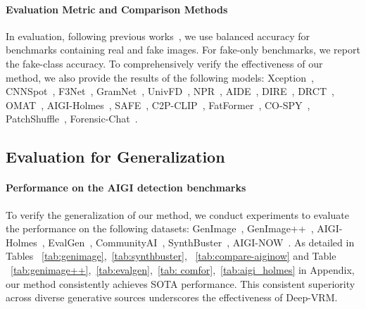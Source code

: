\documentclass{article}
\theoremstyle{plain}
\theoremstyle{definition}
\theoremstyle{remark}
\begin{document}
\paragraph{Evaluation Metric and Comparison Methods}
In evaluation, following previous works~\cite{yan2025orthogonal,chen2025dual}, we use balanced accuracy for benchmarks containing real and fake images. For fake-only benchmarks, we report the fake-class accuracy.
To comprehensively verify the effectiveness of our method, we also provide the results of the following models:
Xception~\citep{chollet2017xception}, CNNSpot~\citep{wang2020cnn}, F3Net~\citep{qian2020thinking}, GramNet~\citep{liu2020global}, UnivFD~\citep{ojha2023towards}, NPR~\citep{tan2024rethinking}, AIDE~\citep{yan2025a}, DIRE~\citep{wang2023dire}, DRCT~\citep{chen2024drct}, OMAT~\citep{zhou2025breaking}, AIGI-Holmes~\citep{zhou2025aigi}, SAFE~\citep{li2025improving}, C2P-CLIP~\citep{tan2025c2p}, FatFormer~\citep{liu2024forgery}, CO-SPY~\citep{cheng2025co}, PatchShuffle~\citep{zheng2024breaking}, Forensic-Chat~\citep{lin2025seeing}.

\subsection{Evaluation for Generalization}
\paragraph{Performance on the AIGI detection benchmarks}
To verify the generalization of our method, we conduct experiments to evaluate the performance on the following datasets: GenImage~\citep{zhu2023genimage}, GenImage++~\cite{zhou2025breaking}, AIGI-Holmes~\cite{zhou2025aigi}, EvalGen~\cite{chen2025dual}, CommunityAI~\cite{park2025community}, SynthBuster~\cite{Synthbuster}, AIGI-NOW~\cite{chen2025task}. 
As detailed in Tables ~\ref{tab:genimage},~\ref{tab:synthbuster}, ~\ref{tab:compare-aiginow} and Table ~\ref{tab:genimage++},~\ref{tab:evalgen},~\ref{tab: comfor},~\ref{tab:aigi_holmes} in Appendix, our method consistently achieves SOTA performance. This consistent superiority across diverse generative sources underscores the effectiveness of Deep-VRM. 
\end{document}
